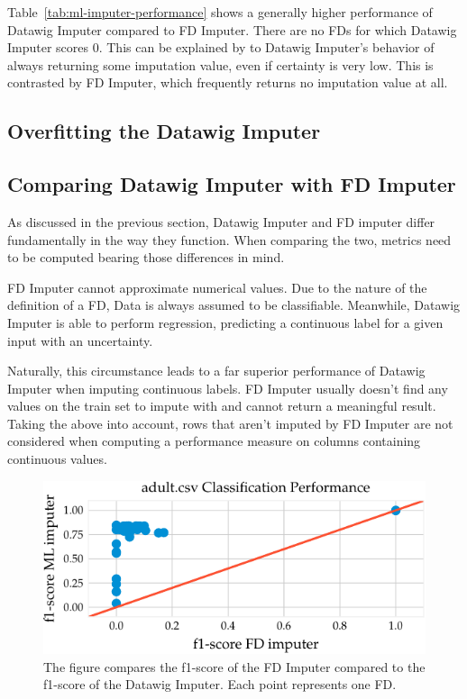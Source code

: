 Table~\ref{tab:ml-imputer-performance} shows a generally higher performance of Datawig Imputer compared to FD Imputer.
There are no FDs for which Datawig Imputer scores 0.
This can be explained by to Datawig Imputer's behavior of always returning some imputation value, even if certainty is very low.
This is contrasted by FD Imputer, which frequently returns no imputation value at all.

\subsection{Overfitting the Datawig Imputer}

\subsection{Comparing Datawig Imputer with FD Imputer}
As discussed in the previous section, Datawig Imputer and FD imputer differ fundamentally in the way they function.
When comparing the two, metrics need to be computed bearing those differences in mind.

FD Imputer cannot approximate numerical values.
Due to the nature of the definition of a FD, Data is always assumed to be classifiable.
Meanwhile, Datawig Imputer is able to perform regression, predicting a continuous label for a given input with an uncertainty.

Naturally, this circumstance leads to a far superior performance of Datawig Imputer when imputing continuous labels.
FD Imputer usually doesn't find any values on the train set to impute with and cannot return a meaningful result.
Taking the above into account, rows that aren't imputed by FD Imputer are not considered when computing a performance measure on columns containing continuous values.

\begin{figure}[ht]
     \centering
     \includegraphics[width=.8\textwidth]{../figures/adult/f1_ml_fd_adult}
     \caption{The figure compares the f1-score of the FD Imputer compared to the f1-score of the Datawig Imputer. Each point represents one FD.}
     \label{fig:f1_ml_fd_adult}
 \end{figure}

